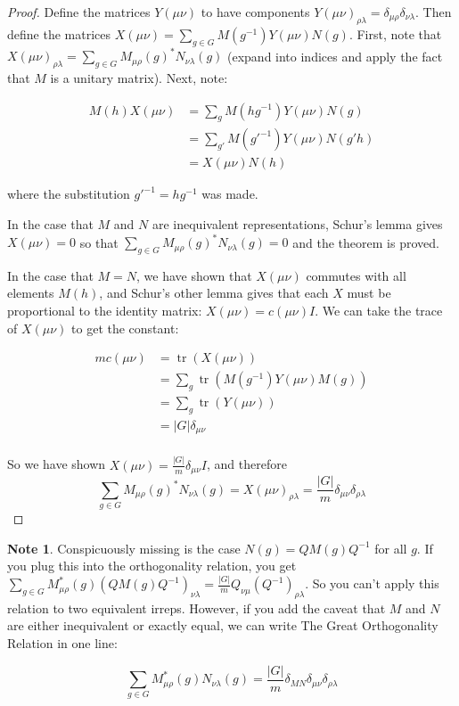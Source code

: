 \documentclass[12pt, letterpaper]{article}
\theoremstyle{definition} %
\newtheorem{note}[thm]{Note}
\def\tr{\operatorname{tr}}
\begin{document}
\begin{proof}
  Define the matrices ${Y}(\mu \nu)$ to have components ${Y}(\mu \nu)_{\rho \lambda}=\delta_{\mu\rho}\delta_{\nu \lambda}$.
  Then define the matrices ${X}(\mu\nu)=\sum_{g\in G} M(g^{-1}) Y(\mu\nu) N(g)$. First, note that 
  $X(\mu\nu)_{\rho\lambda}=\sum_{g\in G} M_{\mu\rho}(g)^* N_{\nu\lambda}(g)$ (expand into indices and apply the fact that $M$ is a unitary matrix). 
  Next, note:

  \begin{align*}
    M(h)X(\mu\nu)&=\sum_g M(h g^{-1}) Y(\mu\nu)N(g)\\
    &= \sum_{g'} M(g'^{-1})Y(\mu\nu) N(g' h)\\
    &= X(\mu\nu)N(h)
  \end{align*}

  where the substitution $g'^{-1}=h g^{-1}$ was made.

  In the case that $M$ and $N$ are inequivalent representations, Schur's lemma gives $X(\mu\nu)=0$ so that $\sum_{g\in G} M_{\mu\rho}(g)^* N_{\nu\lambda}(g)=0$ and the theorem is proved.

  In the case that $M=N$, we have shown that $X(\mu\nu)$ commutes with all elements $M(h)$, and Schur's other lemma gives that each $X$ must be proportional to the identity matrix: $X(\mu\nu)=c(\mu\nu) I$.
  We can take the trace of $X(\mu\nu)$ to get the constant: 
  
  \begin{align*}
    m c(\mu\nu)&=\tr(X(\mu \nu))\\
    &=\sum_g \tr(M(g^{-1}) Y(\mu\nu) M(g))\\
    &=\sum_g \tr(Y(\mu\nu))\\
    &=|G|\delta_{\mu \nu}\\
  \end{align*}

  So we have shown $X(\mu \nu)=\frac{|G|}{m}\delta_{\mu\nu} I$, and therefore 
  \begin{equation*}
    \sum_{g\in G} M_{\mu\rho}(g)^* N_{\nu\lambda}(g)=X(\mu\nu)_{\rho\lambda}=\frac{|G|}{m}\delta_{\mu \nu}\delta_{\rho\lambda}
  \end{equation*}
\end{proof}

\begin{note}
  Conspicuously missing is the case $N(g)=Q M(g)Q^{-1}$ for all $g$.  If you plug this into the orthogonality relation, you get 
  $\sum_{g\in G} M^*_{\mu \rho}(g) (Q M(g) Q^{-1})_{\nu \lambda}=\frac{|G|}{m} Q_{\nu\mu}(Q^{-1})_{\rho\lambda}$. So you can't apply this relation to 
  two equivalent irreps. However, if you add the caveat that $M$ and $N$ are either inequivalent or exactly equal, we can write 
  The Great Orthogonality Relation in one line:

  \begin{equation}
    \sum_{g\in G} M^*_{\mu \rho}(g) N_{\nu \lambda}(g)=\frac{|G|}{m} \delta_{MN}\delta_{\mu \nu}\delta_{\rho \lambda}
    \label{orthogonality}
  \end{equation}
\end{note}
\end{document}
